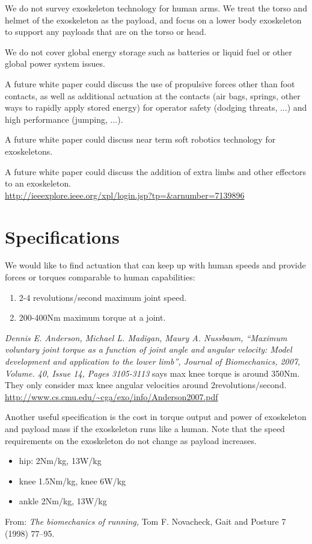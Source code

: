 \documentclass[letterpaper,12pt,fullpage]{article}
\begin{document}
We do not survey exoskeleton technology for human arms. 
We treat the torso and helmet of the exoskeleton as the payload,
and focus on a lower body exoskeleton to support any payloads that
are on the torso or head.

We do not cover global energy storage such as batteries or liquid fuel
or other global power system issues.

A future white paper could discuss the use of propulsive forces other
than foot contacts, as well as additional actuation at the contacts (air
bags, springs, other ways to rapidly apply stored energy) for
operator safety (dodging threats, ...) and high performance (jumping, ...).

A future white paper could discuss near term soft robotics technology
for exoskeletons.

A future white paper could discuss the addition of extra limbs and
other effectors to an exoskeleton.\\
\url{http://ieeexplore.ieee.org/xpl/login.jsp?tp=&arnumber=7139896}\\


%


\section{Specifications}

We would like to find actuation that can keep up with human
speeds and provide forces or torques comparable to human capabilities:
\begin{enumerate}
\item
2-4 revolutions/second maximum joint speed.
\item
200-400Nm maximum torque at a joint.
\end{enumerate}

{\it Dennis E. Anderson, Michael L. Madigan, Maury A. Nussbaum,
“Maximum voluntary joint torque as a function of joint angle and
angular velocity: Model development and application to the lower
limb”, Journal of Biomechanics, 2007, Volume. 40, Issue 14, Pages
3105-3113} says max knee torque is around 350Nm. They only consider
max knee angular velocities around 2revolutions/second.\\
\url{http://www.cs.cmu.edu/~cga/exo/info/Anderson2007.pdf}

Another useful specification is the cost in torque output and power
of exoskeleton and payload mass if the exoskeleton runs like a human.
Note that the speed requirements on the exoskeleton do not change as
payload increases.
\begin{itemize}
\item
hip: 2Nm/kg, 13W/kg
\item
knee 1.5Nm/kg, knee 6W/kg
\item
ankle 2Nm/kg, 13W/kg
\end{itemize}
From: {\it The biomechanics of running,} Tom F. Novacheck,
Gait and Posture 7 (1998) 77–95.
\end{document}
